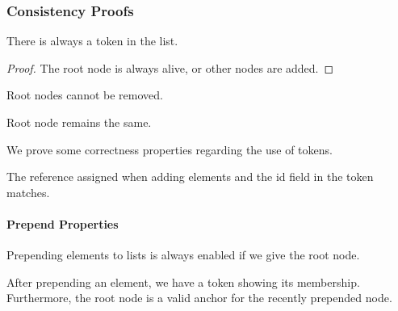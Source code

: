 \subsubsection*{Consistency Proofs}

\begin{theorem}
  \label{thm:MUList.Properties.NotEmpty}
  \leanok
  There is always a token in the list.
  \end{theorem}

\begin{proof}
  The root node is always alive, or other nodes are added.
  \end{proof}

  
\begin{theorem}
  \label{thm:MUList.Properties.not_remove_root}
  \leanok
  Root nodes cannot be removed.
  \end{theorem}

\begin{theorem}
  \label{thm:MUList.Properties.one_root}
  \leanok
  Root node remains the same.
\end{theorem}


We prove some correctness properties regarding the use of tokens.

\begin{theorem}
  \label{thm:MUList.Properties.proof_id_match}
  \leanok
  The reference assigned when adding elements and the id field in the token matches.
  \end{theorem}


\paragraph*{Prepend Properties}

\begin{theorem}
  \label{thm:MUList.Properties.EnabledPrepend}
  \leanok
  Prepending elements to lists is always enabled if we give the root node.
  \end{theorem}

\begin{theorem}
  \label{thm:MUList.Properties.Prepend_Props}
  \leanok
  After prepending an element, we have a token showing its membership.
  Furthermore, the root node is a valid anchor for the recently prepended node.
  \end{theorem}

